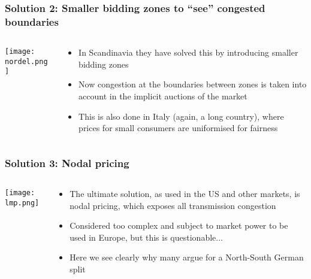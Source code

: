 \documentclass[10pt,dvipsnames]{beamer}
\let\olditem\item
\renewcommand{\item}{%
\olditem\vspace{5pt}}
\begin{document}
\begin{frame}
  \frametitle{Solution 2: Smaller bidding zones to ``see'' congested boundaries}


\begin{columns}[T]
  \begin{column}{5cm}
\texttt{[image: nordel.png]}
  \end{column}
  \begin{column}{5cm}
    \begin{itemize}
      \item In Scandinavia they have solved this by introducing \alert{smaller bidding zones}
      \item Now congestion at the boundaries between zones is taken
        into account in the \alert{implicit auctions} of the market
      \item This is also done in Italy (again, a long country),
          where prices for small consumers are \alert{uniformised} for fairness
    \end{itemize}

\end{column}
\end{columns}


\end{frame}



\begin{frame}
  \frametitle{Solution 3: Nodal pricing}


\begin{columns}[T]
  \begin{column}{6cm}

    \vspace{.5cm}
\texttt{[image: lmp.png]}
  \end{column}
  \begin{column}{5cm}
    \begin{itemize}
    \item The ultimate solution, as used in the US and other markets,
      is \alert{nodal pricing}, which exposes all transmission congestion
    \item Considered too complex and subject to market power to be
      used in Europe, but this is questionable...
      \item Here we see clearly why many argue for a North-South
        German split
    \end{itemize}

\end{column}
\end{columns}



\end{frame}
\end{document}
